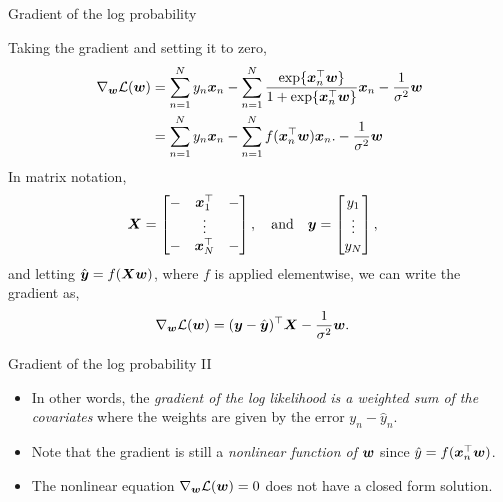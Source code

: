 \documentclass[aspectratio=169]{beamer}
\begin{document}
\begin{frame}{Gradient of the log probability}

Taking the gradient and setting it to zero,
\begin{align}
    \nabla_{\boldsymbol{w}} \mathcal{L}(\boldsymbol{w}) &= 
    \sum_{n=1}^N y_n \boldsymbol{x}_n - \sum_{n=1}^N 
    \frac{\exp\{\boldsymbol{x}_n^\top \boldsymbol{w}\}}{1 + \exp \{\boldsymbol{x}_n^\top \boldsymbol{w}\}} \boldsymbol{x}_n
    - \frac{1}{\sigma^2} \boldsymbol{w}
    \\
    &= \sum_{n=1}^N y_n \boldsymbol{x}_n - \sum_{n=1}^N 
    f(\boldsymbol{x}_n^\top \boldsymbol{w}) \boldsymbol{x}_n.
    - \frac{1}{\sigma^2} \boldsymbol{w}
\end{align}
In matrix notation, 
\begin{align}
    \boldsymbol{X} = \begin{bmatrix} - & \boldsymbol{x}_1^\top & - \\ & \vdots & \\ - & \boldsymbol{x}_N^\top & - \end{bmatrix}, \quad \text{and} \quad  &
    \boldsymbol{y} = \begin{bmatrix} y_1 \\ \vdots \\ y_N \end{bmatrix},
\end{align}
and letting $\hat{\boldsymbol{y}} = f(\boldsymbol{X} \boldsymbol{w})$, where $f$ is applied elementwise, we can write the gradient as,
\begin{align}
    \nabla_{\boldsymbol{w}} \mathcal{L}(\boldsymbol{w}) &= (\boldsymbol{y} - \hat{\boldsymbol{y}})^\top \boldsymbol{X} - \frac{1}{\sigma^2} \boldsymbol{w}.
\end{align}
\end{frame}

\begin{frame}{Gradient of the log probability II}
\begin{itemize}
    \item In other words, the \textit{gradient of the log likelihood is a weighted sum of the covariates} where the weights are given by the error $y_n - \hat{y}_n$.
    
    \item Note that the gradient is still a \textit{nonlinear function of $\boldsymbol{w}$} since $\hat{y} = f(\boldsymbol{x}_n^\top \boldsymbol{w})$. 
    
    \item The nonlinear equation $\nabla_{\boldsymbol{w}} \mathcal{L}(\boldsymbol{w}) = 0$ does not have a closed form solution.
\end{itemize}


\end{frame}
\end{document}
